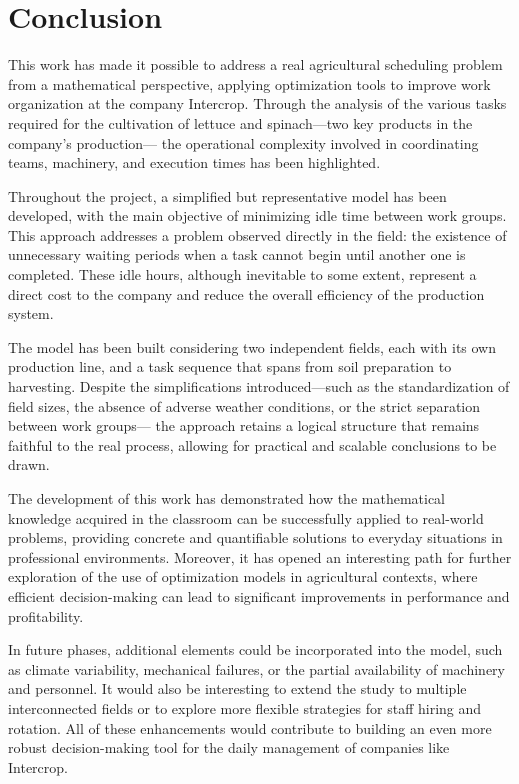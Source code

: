 \chapter*{Conclusion}
This work has made it possible to address a real agricultural scheduling problem from a mathematical perspective,  
applying optimization tools to improve work organization at the company Intercrop.  
Through the analysis of the various tasks required for the cultivation of lettuce and spinach—two key products in the company's production—  
the operational complexity involved in coordinating teams, machinery, and execution times has been highlighted.

Throughout the project, a simplified but representative model has been developed,  
with the main objective of minimizing idle time between work groups.  
This approach addresses a problem observed directly in the field:  
the existence of unnecessary waiting periods when a task cannot begin until another one is completed.  
These idle hours, although inevitable to some extent, represent a direct cost to the company and reduce the overall efficiency of the production system.

The model has been built considering two independent fields, each with its own production line,  
and a task sequence that spans from soil preparation to harvesting.  
Despite the simplifications introduced—such as the standardization of field sizes,  
the absence of adverse weather conditions, or the strict separation between work groups—  
the approach retains a logical structure that remains faithful to the real process,  
allowing for practical and scalable conclusions to be drawn.

The development of this work has demonstrated how the mathematical knowledge acquired in the classroom can be successfully applied to real-world problems,  
providing concrete and quantifiable solutions to everyday situations in professional environments.  
Moreover, it has opened an interesting path for further exploration of the use of optimization models in agricultural contexts,  
where efficient decision-making can lead to significant improvements in performance and profitability.

In future phases, additional elements could be incorporated into the model, such as climate variability,  
mechanical failures, or the partial availability of machinery and personnel.  
It would also be interesting to extend the study to multiple interconnected fields or to explore more flexible strategies for staff hiring and rotation.  
All of these enhancements would contribute to building an even more robust decision-making tool for the daily management of companies like Intercrop.

